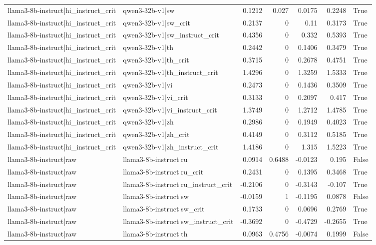 \begin{table}
\begin{tabular}{l l r r r r l}
llama3-8b-instruct|hi_instruct_crit & qwen3-32b-v1|sw & 0.1212 & 0.027 & 0.0175 & 0.2248 & True \\
llama3-8b-instruct|hi_instruct_crit & qwen3-32b-v1|sw_crit & 0.2137 & 0 & 0.11 & 0.3173 & True \\
llama3-8b-instruct|hi_instruct_crit & qwen3-32b-v1|sw_instruct_crit & 0.4356 & 0 & 0.332 & 0.5393 & True \\
llama3-8b-instruct|hi_instruct_crit & qwen3-32b-v1|th & 0.2442 & 0 & 0.1406 & 0.3479 & True \\
llama3-8b-instruct|hi_instruct_crit & qwen3-32b-v1|th_crit & 0.3715 & 0 & 0.2678 & 0.4751 & True \\
llama3-8b-instruct|hi_instruct_crit & qwen3-32b-v1|th_instruct_crit & 1.4296 & 0 & 1.3259 & 1.5333 & True \\
llama3-8b-instruct|hi_instruct_crit & qwen3-32b-v1|vi & 0.2473 & 0 & 0.1436 & 0.3509 & True \\
llama3-8b-instruct|hi_instruct_crit & qwen3-32b-v1|vi_crit & 0.3133 & 0 & 0.2097 & 0.417 & True \\
llama3-8b-instruct|hi_instruct_crit & qwen3-32b-v1|vi_instruct_crit & 1.3749 & 0 & 1.2712 & 1.4785 & True \\
llama3-8b-instruct|hi_instruct_crit & qwen3-32b-v1|zh & 0.2986 & 0 & 0.1949 & 0.4023 & True \\
llama3-8b-instruct|hi_instruct_crit & qwen3-32b-v1|zh_crit & 0.4149 & 0 & 0.3112 & 0.5185 & True \\
llama3-8b-instruct|hi_instruct_crit & qwen3-32b-v1|zh_instruct_crit & 1.4186 & 0 & 1.315 & 1.5223 & True \\
llama3-8b-instruct|raw & llama3-8b-instruct|ru & 0.0914 & 0.6488 & -0.0123 & 0.195 & False \\
llama3-8b-instruct|raw & llama3-8b-instruct|ru_crit & 0.2431 & 0 & 0.1395 & 0.3468 & True \\
llama3-8b-instruct|raw & llama3-8b-instruct|ru_instruct_crit & -0.2106 & 0 & -0.3143 & -0.107 & True \\
llama3-8b-instruct|raw & llama3-8b-instruct|sw & -0.0159 & 1 & -0.1195 & 0.0878 & False \\
llama3-8b-instruct|raw & llama3-8b-instruct|sw_crit & 0.1733 & 0 & 0.0696 & 0.2769 & True \\
llama3-8b-instruct|raw & llama3-8b-instruct|sw_instruct_crit & -0.3692 & 0 & -0.4729 & -0.2655 & True \\
llama3-8b-instruct|raw & llama3-8b-instruct|th & 0.0963 & 0.4756 & -0.0074 & 0.1999 & False \\

\end{tabular}
\end{table}
